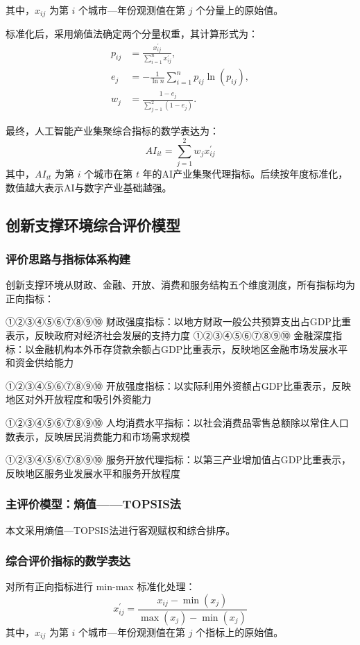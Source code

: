 \documentclass[12pt, a4paper]{ctexart}
\newcommand{\circlednum}[1]{%
    \mbox{{\papersymbolfont\ifcase#1\or ①\or ②\or ③\or ④\or ⑤\or ⑥\or ⑦\or ⑧\or ⑨\or ⑩\else #1\fi}}%
}
\newcommand{\one}{\circlednum{1}}
\newcommand{\two}{\circlednum{2}}
\newcommand{\three}{\circlednum{3}}
\newcommand{\four}{\circlednum{4}}
\newcommand{\five}{\circlednum{5}}
\begin{document}
其中，$x_{ij}$ 为第 $i$ 个城市—年份观测值在第 $j$ 个分量上的原始值。

标准化后，采用熵值法确定两个分量权重，其计算形式为：
\begin{equation}
    \begin{aligned}
        p_{ij} &= \frac{x_{ij}^{\prime}}{\sum_{i=1}^{n}x_{ij}^{\prime}},\\
        e_j &= -\frac{1}{\ln n}\sum_{i=1}^{n}p_{ij}\ln(p_{ij}),\\
        w_j &= \frac{1-e_j}{\sum_{j=1}^{2}(1-e_j)}.
    \end{aligned}
\end{equation}

最终，人工智能产业集聚综合指标的数学表达为：
\begin{equation}
    AI_{it}=\sum_{j=1}^{2}w_jx_{ij}^{\prime}
\end{equation}
其中，$AI_{it}$ 为第 $i$ 个城市在第 $t$ 年的AI产业集聚代理指标。后续按年度标准化，数值越大表示AI与数字产业基础越强。

\subsection{创新支撑环境综合评价模型}
\subsubsection{评价思路与指标体系构建}
创新支撑环境从财政、金融、开放、消费和服务结构五个维度测度，所有指标均为正向指标：

{\songti \one 财政强度指标：}以地方财政一般公共预算支出占GDP比重表示，反映政府对经济社会发展的支持力度
{\songti \two 金融深度指标：}以金融机构本外币存贷款余额占GDP比重表示，反映地区金融市场发展水平和资金供给能力

{\songti \three 开放强度指标：}以实际利用外资额占GDP比重表示，反映地区对外开放程度和吸引外资能力

{\songti \four 人均消费水平指标：}以社会消费品零售总额除以常住人口数表示，反映居民消费能力和市场需求规模

{\songti \five 服务开放代理指标：}以第三产业增加值占GDP比重表示，反映地区服务业发展水平和服务开放程度

\subsubsection{主评价模型：熵值——TOPSIS法}
本文采用熵值—TOPSIS法进行客观赋权和综合排序。

\subsubsection{综合评价指标的数学表达}
对所有正向指标进行 min-max 标准化处理：
\begin{equation}
    x_{ij}^{\prime}=\frac{x_{ij}-\min(x_j)}{\max(x_j)-\min(x_j)}
\end{equation}
其中，$x_{ij}$ 为第 $i$ 个城市—年份观测值在第 $j$ 个指标上的原始值。
\end{document}

